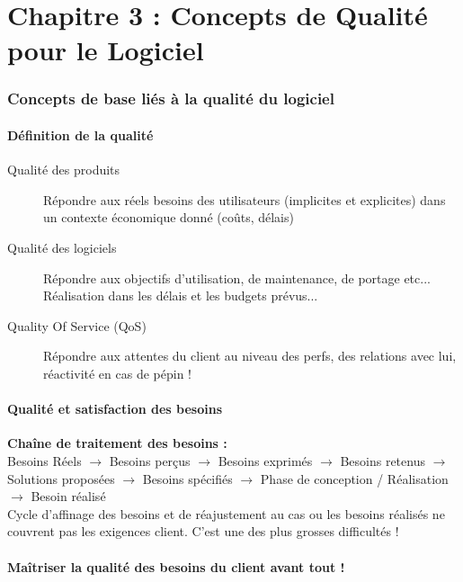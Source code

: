\part{Chapitre 3 : Concepts de Qualité pour le Logiciel}

\section{Concepts de base liés à la qualité du logiciel}

	\subsection{Définition de la qualité}

	\begin{description}
    \item[Qualité des produits] Répondre aux réels besoins des utilisateurs (implicites et explicites) dans un contexte économique donné (coûts, délais)
    \item[Qualité des logiciels] Répondre aux objectifs d’utilisation, de maintenance, de portage etc... Réalisation dans les délais et les budgets prévus...
    \item[Quality Of Service (QoS)] Répondre aux attentes du client au niveau des perfs, des relations avec lui, réactivité en cas de pépin !
	\end{description}


   \subsection{Qualité et satisfaction des besoins}

\textbf{Chaîne de traitement des besoins :}\hfill\\

Besoins Réels $\rightarrow$ Besoins perçus $\rightarrow$ Besoins exprimés $\rightarrow$ Besoins retenus  $\rightarrow$  Solutions proposées $\rightarrow$ Besoins spécifiés $\rightarrow$ Phase de conception / Réalisation $\rightarrow$ Besoin réalisé\\

Cycle d’affinage des besoins et de réajustement au cas ou les besoins réalisés ne couvrent pas les exigences client. C’est une des plus grosses difficultés !\\

   \subsection{Maîtriser la qualité des besoins du client avant tout !}

